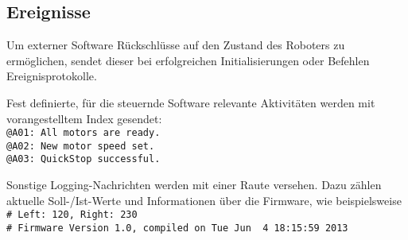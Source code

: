 \subsection{Ereignisse}
Um externer Software Rückschlüsse auf den Zustand des Roboters zu ermöglichen, sendet dieser bei erfolgreichen Initialisierungen oder Befehlen Ereignisprotokolle.

Fest definierte, für die steuernde Software relevante Aktivitäten werden mit vorangestelltem Index gesendet:\\
\lstinline{@A01: All motors are ready.}\\
\lstinline{@A02: New motor speed set.}\\
\lstinline{@A03: QuickStop successful.}

Sonstige Logging-Nachrichten werden mit einer Raute versehen.
Dazu zählen aktuelle Soll-/Ist-Werte und Informationen über die Firmware, wie beispielsweise\\
\lstinline{# Left: 120, Right: 230}\\
\lstinline{# Firmware Version 1.0, compiled on Tue Jun  4 18:15:59 2013}
